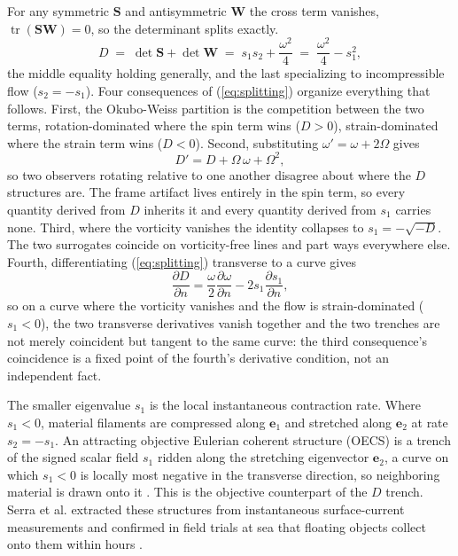 \documentclass[lettersize,journal]{IEEEtran}
\begin{document}
For any symmetric $\mathbf{S}$ and antisymmetric $\mathbf{W}$ the cross
term vanishes, $\operatorname{tr}(\mathbf{S}\mathbf{W}) = 0$, so the
determinant splits exactly.
\begin{equation}
    D \;=\; \det\mathbf{S} + \det\mathbf{W}
      \;=\; s_1 s_2 + \frac{\omega^2}{4}
      \;=\; \frac{\omega^2}{4} - s_1^2,
    \label{eq:splitting}
\end{equation}
the middle equality holding generally, and the last specializing to incompressible flow ($s_2 = -s_1$). Four
consequences of (\ref{eq:splitting}) organize everything that follows.
First, the Okubo-Weiss partition is the competition between the two
terms, rotation-dominated where the spin term wins ($D > 0$),
strain-dominated where the strain term wins ($D < 0$). Second,
substituting $\omega' = \omega + 2\Omega$ gives
\begin{equation}
    D' = D + \Omega\,\omega + \Omega^2,
    \label{eq:D_not_objective}
\end{equation}
so two observers rotating relative to one another disagree about where
the $D$ structures are. The frame artifact lives entirely in the spin
term, so every quantity derived from $D$ inherits it and every quantity
derived from $s_1$ carries none.
Third, where the vorticity vanishes the identity collapses to
$s_1 = -\sqrt{-D}$. The two surrogates coincide on vorticity-free
lines and part ways everywhere else. Fourth, differentiating
(\ref{eq:splitting}) transverse to a curve gives
\begin{equation}
    \frac{\partial D}{\partial n} =
    \frac{\omega}{2}\frac{\partial \omega}{\partial n}
    - 2 s_1 \frac{\partial s_1}{\partial n},
    \label{eq:trench_coincide}
\end{equation}
so on a curve where the vorticity vanishes and the flow is
strain-dominated ($s_1 < 0$), the two transverse derivatives vanish
together and the two trenches are not merely coincident but tangent to
the same curve: the third consequence's coincidence is a fixed point of
the fourth's derivative condition, not an independent fact.

The smaller eigenvalue $s_1$ is the local instantaneous contraction
rate. Where $s_1 < 0$, material filaments are compressed along
$\mathbf{e}_1$ and stretched along $\mathbf{e}_2$ at rate $s_2 = -s_1$.
An attracting objective Eulerian coherent structure (OECS) is a trench
of the signed scalar field $s_1$ ridden along the stretching eigenvector
$\mathbf{e}_2$, a curve on which $s_1 < 0$ is locally most negative in
the transverse direction, so neighboring material is drawn onto it
\cite{24}. This is the objective counterpart of the $D$ trench. Serra
et al. extracted these structures from instantaneous surface-current
measurements and confirmed in field trials at sea that floating objects
collect onto them within hours \cite{35}.
\end{document}
